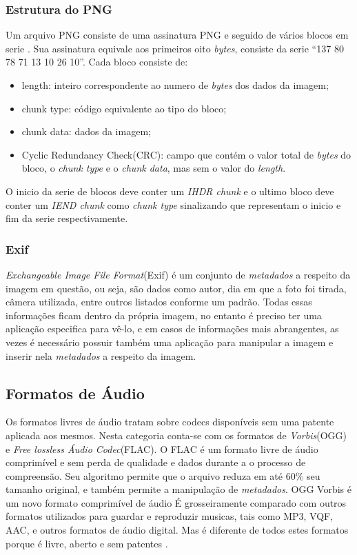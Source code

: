 \subsubsection{Estrutura do PNG}
Um arquivo PNG consiste de uma assinatura PNG e seguido de vários blocos em serie \cite{PNG Development Group 1999}.
Sua assinatura equivale aos primeiros oito \textit{bytes}, consiste da serie “137 80 78 71 13 10 26 10”. 
Cada bloco consiste de:
\begin{itemize}
    \item{length: inteiro correspondente ao numero de \textit{bytes} dos dados da imagem;}
    \item{chunk type: código equivalente ao tipo do bloco;}
    \item{chunk data: dados da imagem;}
    \item{Cyclic Redundancy Check(CRC): campo que contém o valor total de \textit{bytes} do bloco, o \textit{chunk type} e o \textit{chunk data}, mas sem o valor do \textit{length}.}
\end{itemize}
O inicio da serie de blocos deve conter um \textit{IHDR chunk} e o ultimo bloco deve conter um \textit{IEND chunk} como \textit{chunk type} sinalizando que representam o inicio e fim da serie respectivamente.

\subsubsection{Exif}
\textit{Exchangeable Image File Format}(Exif) é um conjunto de \textit{metadados} a respeito da imagem em questão, ou seja, são dados como autor, dia em que a foto foi tirada, câmera utilizada, entre outros listados conforme um padrão.
Todas essas informações ficam dentro da própria imagem, no entanto é preciso ter uma aplicação especifica para vê-lo, e em casos de informações mais abrangentes, as vezes é necessário possuir também uma aplicação para manipular a imagem e inserir nela \textit{metadados} a respeito da imagem.

\subsection{Formatos de Áudio}
Os formatos livres de áudio tratam sobre codecs disponíveis sem uma patente aplicada aos mesmos. Nesta categoria conta-se com os formatos de \textit{Vorbis}(OGG)  e \textit{Free lossless Áudio Codec}(FLAC). 
O FLAC é um formato livre de áudio comprimível e sem perda de qualidade e dados durante a o processo de compreensão. Seu algoritmo permite que o arquivo reduza em até 60\% seu tamanho original, e também permite a manipulação de \textit{metadados}.
OGG Vorbis é um novo formato comprimível de áudio É grosseiramente comparado com outros formatos utilizados para guardar e reproduzir musicas, tais como MP3, VQF, AAC, e outros formatos de áudio digital. Mas é diferente de todos estes formatos porque é livre, aberto e sem patentes \cite{Xiph.Org 2008}.

